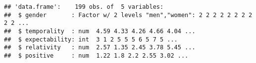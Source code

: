 \documentclass[
]{article}
\newenvironment{Shaded}{\begin{snugshade}}{\end{snugshade}}
\newcommand{\DataTypeTok}[1]{\textcolor[rgb]{0.13,0.29,0.53}{#1}}
\newcommand{\KeywordTok}[1]{\textcolor[rgb]{0.13,0.29,0.53}{\textbf{#1}}}
\newcommand{\NormalTok}[1]{#1}
\newcommand{\OperatorTok}[1]{\textcolor[rgb]{0.81,0.36,0.00}{\textbf{#1}}}
\newcommand{\OtherTok}[1]{\textcolor[rgb]{0.56,0.35,0.01}{#1}}
\newcommand{\StringTok}[1]{\textcolor[rgb]{0.31,0.60,0.02}{#1}}
\begin{document}
\begin{verbatim}
## 'data.frame':    199 obs. of  5 variables:
##  $ gender       : Factor w/ 2 levels "men","women": 2 2 2 2 2 2 2 2 2 2 ...
##  $ temporality  : num  4.59 4.33 4.26 4.66 4.04 ...
##  $ expectability: int  3 1 2 5 5 5 6 5 7 5 ...
##  $ relativity   : num  2.57 1.35 2.45 3.78 5.45 ...
##  $ positive     : num  1.22 1.8 2.2 2.55 3.02 ...
\end{verbatim}

\begin{Shaded}
\end{Shaded}
\end{document}
